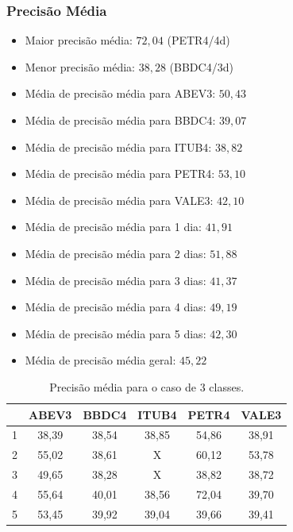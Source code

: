 \documentclass[grad,numbers]{coppe}
\begin{document}
	 			\subsubsection{Precisão Média}
		 			\begin{itemize}
		 				\item Maior precisão média: $72,04$ (PETR4/4d)
		 				\item Menor precisão média: $38,28$ (BBDC4/3d)
		 				\item Média de precisão média para ABEV3: $50,43$
		 				\item Média de precisão média para BBDC4: $39,07$
		 				\item Média de precisão média para ITUB4: $38,82$
		 				\item Média de precisão média para PETR4: $53,10$
		 				\item Média de precisão média para VALE3: $42,10$
		 				\item Média de precisão média para 1 dia: $41,91$
		 				\item Média de precisão média para 2 dias: $51,88$
		 				\item Média de precisão média para 3 dias: $41,37$
		 				\item Média de precisão média para 4 dias: $49,19$
		 				\item Média de precisão média para 5 dias: $42,30$
		 				\item Média de precisão média geral: $45,22$
		 			\end{itemize}
		 			\begin{table}[h]
		 				\caption{Precisão média para o caso de 3 classes.}
		 				\label{tab:3c_pr_analysis}
		 				\centering
		 				{\footnotesize
		 					\begin{tabular}{|c|c|c|c|c|c|}
		 						\hline
		 						\diagbox[linewidth=0.2pt, width=\dimexpr \textwidth/10+2\tabcolsep\relax, height=0.8cm]{Dias}{Ativo}
		 						& ABEV3 & BBDC4 & ITUB4 & PETR4 & VALE3\\
		 						\hline
		 						1 & 38,39 & 38,54 & 38,85 & 54,86 & 38,91 \\
		 						2 & 55,02 & 38,61 & X     & 60,12 & 53,78 \\
		 						3 & 49,65 & 38,28 & X     & 38,82 & 38,72 \\
		 						4 & 55,64 & 40,01 & 38,56 & 72,04 & 39,70 \\
		 						5 & 53,45 & 39,92 & 39,04 & 39,66 & 39,41 \\
		 						\hline
		 				\end{tabular}}
		 			\end{table}
	 			\newpage
\end{document}
